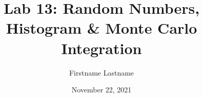 \newcommand{\course}{MATH 3341}
\title{Lab 13: Random Numbers, Histogram \& Monte Carlo Integration}
\author{Firstname Lastname}
\date{November 22, 2021}

